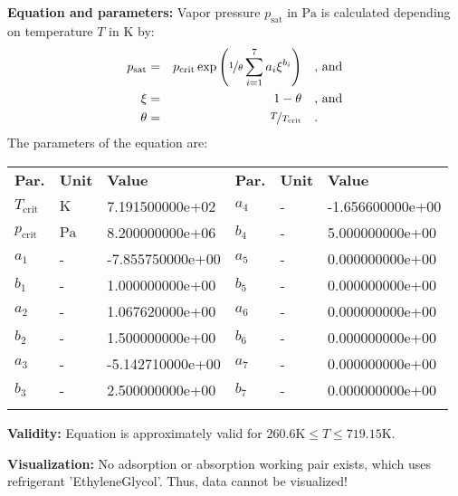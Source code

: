 \textbf{Equation and parameters:}
\newline
%
Vapor pressure $p_\mathrm{sat}$ in $\si{\pascal}$ is calculated depending on temperature $T$ in $\si{\kelvin}$ by:
%
\begin{equation*}
\begin{split}
p_\mathrm{sat} &=& p_\mathrm{crit} \exp \left( \nicefrac{1}{\theta} \sum_{i=1}^{7} a_i \xi^{b_i} \right) & \quad\text{, and} \\
\xi &=& 1 - \theta & \quad\text{, and} \\
\theta &=& \nicefrac{T}{T_\mathrm{crit}} & \quad\text{.}
\end{split}
\end{equation*}
%
The parameters of the equation are:
%
\begin{longtable}[l]{lll|lll}
\toprule
\addlinespace
\textbf{Par.} & \textbf{Unit} & \textbf{Value} &	\textbf{Par.} & \textbf{Unit} & \textbf{Value} \\
\addlinespace
\midrule
\endhead

\bottomrule
\endfoot
\bottomrule
\endlastfoot
\addlinespace

$T_\mathrm{crit}$ & $\si{\kelvin}$ & 7.191500000e+02 & $a_4$ & - & -1.656600000e+00 \\
$p_\mathrm{crit}$ & $\si{\pascal}$ & 8.200000000e+06 & $b_4$ & - & 5.000000000e+00 \\
$a_1$ & - & -7.855750000e+00 & $a_5$ & - & 0.000000000e+00 \\
$b_1$ & - & 1.000000000e+00 & $b_5$ & - & 0.000000000e+00 \\
$a_2$ & - & 1.067620000e+00 & $a_6$ & - & 0.000000000e+00 \\
$b_2$ & - & 1.500000000e+00 & $b_6$ & - & 0.000000000e+00 \\
$a_3$ & - & -5.142710000e+00 & $a_7$ & - & 0.000000000e+00 \\
$b_3$ & - & 2.500000000e+00 & $b_7$ & - & 0.000000000e+00 \\

\addlinespace\end{longtable}

\textbf{Validity:}
\newline
Equation is approximately valid for $260.6 \si{\kelvin} \leq T \leq 719.15 \si{\kelvin}$.
\newline

\textbf{Visualization:}
%
\newline
No adsorption or absorption working pair exists, which uses refrigerant 'EthyleneGlycol'. Thus, data cannot be visualized!
%

